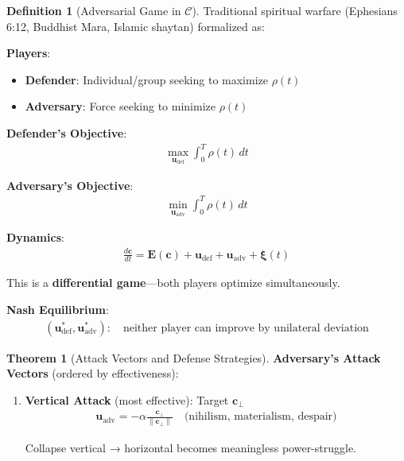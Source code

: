 \documentclass[11pt,a4paper]{article}
\theoremstyle{definition}
\newtheorem{definition}{Definition}[section]
\newtheorem{theorem}{Theorem}[section]
\theoremstyle{remark}
\newcommand{\CC}{\mathcal{C}}
\newcommand{\EE}{\mathbf{E}}
\newcommand{\cc}{\mathbf{c}}
\begin{document}
\begin{enumerate}
\begin{definition}[Adversarial Game in \(\CC\)]
Traditional spiritual warfare (Ephesians 6:12, Buddhist Mara, Islamic shaytan) formalized as:

\textbf{Players}:
\begin{itemize}
    \item \textbf{Defender}: Individual/group seeking to maximize \(\rho(t)\)
    \item \textbf{Adversary}: Force seeking to minimize \(\rho(t)\)
\end{itemize}

\textbf{Defender's Objective}:
\begin{align}
\max_{\mathbf{u}_{\text{def}}} \int_0^T \rho(t) \, dt
\end{align}

\textbf{Adversary's Objective}:
\begin{align}
\min_{\mathbf{u}_{\text{adv}}} \int_0^T \rho(t) \, dt
\end{align}

\textbf{Dynamics}:
\begin{align}
\frac{d\cc}{dt} = \EE(\cc) + \mathbf{u}_{\text{def}} + \mathbf{u}_{\text{adv}} + \boldsymbol{\xi}(t)
\end{align}

This is a \textbf{differential game}—both players optimize simultaneously.

\textbf{Nash Equilibrium}:
\begin{align}
(\mathbf{u}^*_{\text{def}}, \mathbf{u}^*_{\text{adv}}) : \quad \text{neither player can improve by unilateral deviation}
\end{align}
\end{definition}

\begin{theorem}[Attack Vectors and Defense Strategies]
\textbf{Adversary's Attack Vectors} (ordered by effectiveness):

\begin{enumerate}
    \item \textbf{Vertical Attack} (most effective): Target \(\cc_\perp\)
        \begin{align}
        \mathbf{u}_{\text{adv}} = -\alpha \frac{\cc_\perp}{\|\cc_\perp\|} \quad \text{(nihilism, materialism, despair)}
        \end{align}
        
        Collapse vertical → horizontal becomes meaningless power-struggle.
    

\end{enumerate}
\end{theorem}
\end{enumerate}
\end{document}
